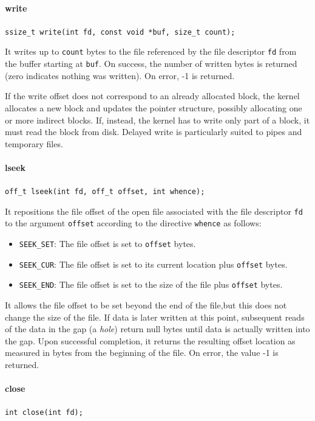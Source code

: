 \paragraph{write}
\texttt{ssize\_t write(int fd, const void *buf, size\_t count);}

It writes up to \texttt{count} bytes to the file referenced by the file descriptor \texttt{fd} from the buffer starting at \texttt{buf}. On success, the number of written bytes is returned (zero indicates nothing was written). On error, -1 is returned.

If the write offset does not correspond to an already allocated block, the kernel allocates a new block and updates the pointer structure, possibly allocating one or more indirect blocks. If, instead, the kernel has to write only part of a block, it must read the block from disk. Delayed write is particularly suited to pipes and temporary files.

\paragraph{lseek}
\texttt{off\_t lseek(int fd, off\_t offset, int whence);}

It repositions the file offset of the open file associated with the file descriptor \texttt{fd} to the argument \texttt{offset} according to the directive \texttt{whence} as follows:
\begin{itemize}
\item \texttt{SEEK\_SET}: The file offset is set to \texttt{offset} bytes.
\item \texttt{SEEK\_CUR}: The file offset is set to its current location plus \texttt{offset} bytes.
\item \texttt{SEEK\_END}: The file offset is set to the size of the file plus \texttt{offset} bytes.
\end{itemize}
It allows the file offset to be set beyond the end of the file,but this does not change the size of the file. If data is later written at this point, subsequent reads of the data in the gap (a \emph{hole}) return null bytes until data is actually written into the gap. Upon successful completion, it returns the resulting offset location as measured in bytes from the beginning of the file.  On error, the value -1 is returned.

\paragraph{close}
\texttt{int close(int fd);}

